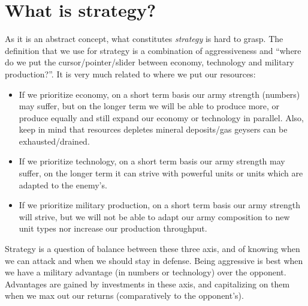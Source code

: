 \section{What is strategy?}
\label{sec:whatisstrategy}


As it is an abstract concept, what constitutes \textit{strategy} is hard to grasp. The definition that we use for strategy is a combination of aggressiveness and ``where do we put the cursor/pointer/slider between economy, technology and military production?''. It is very much related to where we put our resources:
\begin{itemize}
    \item If we prioritize economy, on a short term basis our army strength (numbers) may suffer, but on the longer term we will be able to produce more, or produce equally and still expand our economy or technology in parallel. Also, keep in mind that resources depletes mineral deposits/gas geysers can be exhausted/drained.
    \item If we prioritize technology, on a short term basis our army strength may suffer, on the longer term it can strive with powerful units or units which are adapted to the enemy's.
    \item If we prioritize military production, on a short term basis our army strength will strive, but we will not be able to adapt our army composition to new unit types nor increase our production throughput.
\end{itemize}
Strategy is a question of balance between these three axis, and of knowing when we can attack and when we should stay in defense. Being aggressive is best when we have a military advantage (in numbers or technology) over the opponent. Advantages are gained by investments in these axis, and capitalizing on them when we max out our returns (comparatively to the opponent's).

